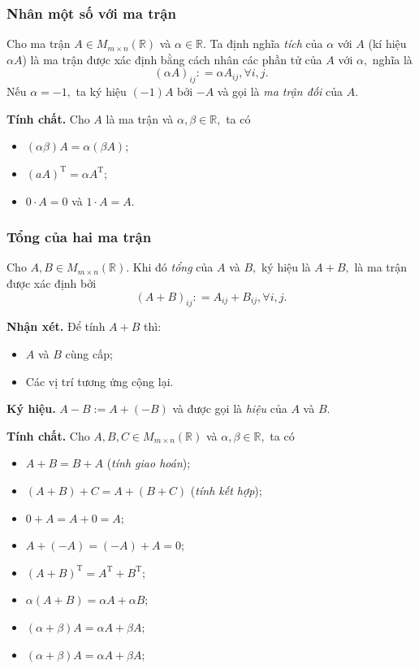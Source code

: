 \subsubsection{Nhân một số với ma trận}
Cho ma trận $A \in M_{m \times n} \left( {\mathbb{R}} \right)$ và $\alpha \in \mathbb{R}.$ Ta định nghĩa \textit{tích} của $\alpha$ với $A$ (kí hiệu $\alpha A$) là ma trận được xác định bằng cách nhân các phần tử của $A$ với $\alpha,$ nghĩa là
$${\left( {\alpha A} \right)_{ij}}: = \alpha {A_{ij}},\forall i,j.$$
Nếu $\alpha = -1,$ ta ký  hiệu $\left( {-1} \right) A$ bởi $ -A$ và gọi là \textit{ma trận đối} của $A.$
\begin{mybox}
\textbf{Tính chất.} Cho $A$ là ma trận và $\alpha, \beta \in \mathbb{R},$ ta có
\begin{itemize}
\item $\left( {\alpha \beta} \right) A = \alpha \left( {\beta A} \right);$
\item $\left( {aA} \right) ^{\mathrm{T}} = \alpha A ^{\mathrm{T}};$
\item $0 \cdot A = 0$ và $1 \cdot A = A.$
\end{itemize}
\end{mybox}
\subsubsection{Tổng của hai ma trận}
Cho $A, B \in M_{m \times n} \left( {\mathbb{R}} \right).$ Khi đó \textit{tổng} của $A$ và $B,$ ký hiệu là $A + B,$ là ma trận được xác định bởi
$${\left( {A + B} \right)_{ij}}: = {A_{ij}} + {B_{ij}},\forall i,j.$$
\begin{mybox}
\textbf{Nhận xét.} Để tính $A + B$ thì:
\begin{itemize}
\item $A$ và $B$ cùng cấp;
\item Các vị trí tương ứng cộng lại.
\end{itemize}
\end{mybox}
\textbf{Ký hiệu.} $A - B := A + \left( {-B} \right)$ và được gọi là \textit{hiệu} của $A$ và $B.$ 
\begin{mybox}
\textbf{Tính chất.} Cho $A, B, C \in M_{m \times n} \left( {\mathbb{R}} \right)$ và $\alpha, \beta \in \mathbb{R},$ ta có
\begin{itemize}
\item $A + B = B + A$ (\textit{tính giao hoán});
\item $\left( {A + B} \right) + C = A + \left( {B + C} \right)$ (\textit{tính kết hợp});
\item $0 + A = A + 0 = A;$
\item $A + \left( { - A} \right) = \left( { - A} \right) + A = 0;$
\item ${\left( {A + B} \right)^{\mathrm{T}}} = {A^{\mathrm{T}}} + {B^{\mathrm{T}}};$
\item $\alpha \left( {A + B} \right) = \alpha A + \alpha B;$
\item $\left( {\alpha  + \beta } \right)A = \alpha A + \beta A;$
\item $\left( {\alpha  + \beta } \right)A = \alpha A + \beta A;$
\end{itemize}
\end{mybox}
